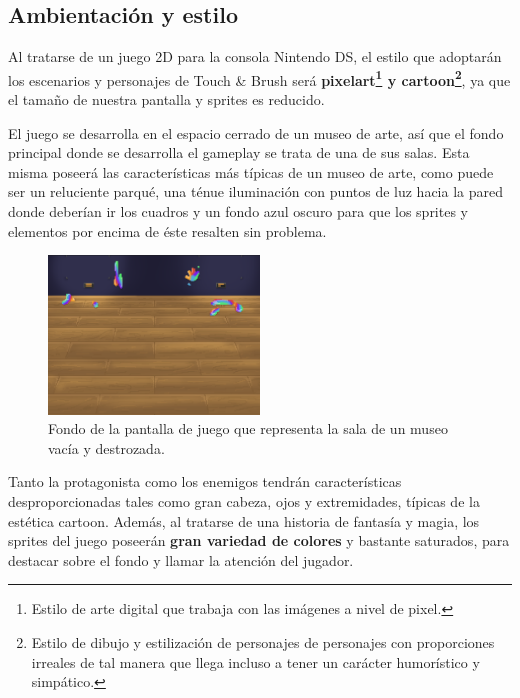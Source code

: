 \vspace{1cm}


\subsection{Ambientación y estilo}

Al tratarse de un juego 2D para la consola Nintendo DS, el estilo que adoptarán los escenarios y personajes de Touch \& Brush será \textbf{pixelart\footnote{Estilo de arte digital que trabaja con las imágenes a nivel de pixel.} y  cartoon\footnote{Estilo de dibujo y estilización de personajes de personajes con proporciones irreales de tal manera que llega incluso a tener un carácter humorístico y simpático.}}, ya que el tamaño de nuestra pantalla y sprites es reducido.

\vspace{0.5cm}

El juego se desarrolla en el espacio cerrado de un museo de arte, así que el fondo principal donde se desarrolla el gameplay se trata de una de sus salas. Esta misma poseerá las características más típicas de un museo de arte, como puede ser un reluciente parqué, una ténue iluminación con puntos de luz hacia la pared donde deberían ir los cuadros y un fondo azul oscuro para que los sprites y elementos por encima de éste resalten sin problema.

\vspace{0.5cm}

\begin{figure}[htbp]
\centering
  \includegraphics[width=0.5\textwidth]{archivos/bg.png}
  \caption{Fondo de la pantalla de juego que representa la sala de un museo vacía y destrozada.}
  \label{fig:bg_museum}
\end{figure}

\vspace{0.5cm}

Tanto la protagonista como los enemigos tendrán características desproporcionadas tales como gran cabeza, ojos y extremidades, típicas de la estética cartoon. Además, al tratarse de una historia de fantasía y magia, los sprites del juego poseerán \textbf{gran variedad de colores} y bastante saturados, para destacar sobre el fondo y llamar la atención del jugador.



